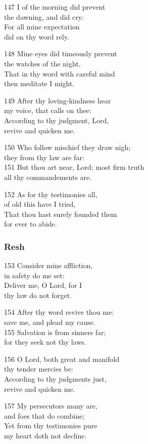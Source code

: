 \begin{multicols}{3}
147 I of the morning did prevent\\
the dawning, and did cry:\\
For all mine expectation\\
did on thy word rely.

148 Mine eyes did timeously prevent\\
the watches of the night,\\
That in thy word with careful mind\\
then meditate I might.

149 After thy loving-kindness hear\\
my voice, that calls on thee:\\
According to thy judgment, Lord,\\
revive and quicken me.

150 Who follow mischief they draw nigh;\\
they from thy law are far:\\
151 But thou art near, Lord; most firm truth\\
all thy commandements are.

152 As for thy testimonies all,\\
of old this have I tried,\\
That thou hast surely founded them\\
for ever to abide.

\subsubsection*{Resh}

153 Consider mine affliction,\\
in safety do me set:\\
Deliver me, O Lord, for I\\
thy law do not forget.

154 After thy word revive thou me:\\
save me, and plead my cause.\\
155 Salvation is from sinners far;\\
for they seek not thy laws.

156 O Lord, both great and manifold\\
thy tender mercies be:\\
According to thy judgments just,\\
revive and quicken me.

157 My persecutors many are,\\
and foes that do combine;\\
Yet from thy testimonies pure\\
my heart doth not decline.


\end{multicols}
